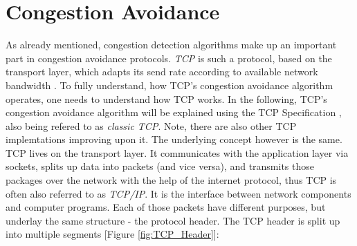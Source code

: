 \documentclass[a4paper,conference]{IEEEtran}
\begin{document}
\section{Congestion Avoidance}
\label{sec:ca}
As already mentioned, congestion detection algorithms make up an important part in congestion avoidance protocols. \textit{TCP} is such a protocol, based on the transport layer, which adapts its send rate according to available network bandwidth \cite{1209197,jacobson1992tcp}. To fully understand, how TCP's congestion avoidance algorithm operates, one needs to understand how TCP works. In the following, TCP's congestion avoidance algorithm will be explained using the TCP Specification \cite{ietf-tcpm-rfc793bis-16,postel1981transmission}, also being refered to as \textit{classic TCP}. Note, there are also other TCP implemtations improving upon it. The underlying concept however is the same.
\\TCP lives on the transport layer. It communicates with the application layer via sockets, splits up data into packets (and vice versa), and transmits those packages over the network with the help of the internet protocol, thus TCP is often also referred to as \textit{TCP/IP}. It is the interface between network components and computer programs. Each of those packets have different purposes, but underlay the same structure - the protocol header. The TCP header is split up into multiple segments [Figure \ref{fig:TCP_Header}]:
\end{document}
